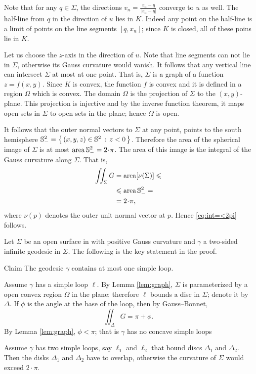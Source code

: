 Note that for any $q\in \Sigma$, the directions $v_n=\tfrac{x_n-q}{|x_n-q|}$ converge to $u$ as well.
The half-line from $q$ in the direction of $u$ lies in $K$.
Indeed any point on the half-line is a limit of points on the line segments $[q,x_n]$;
since $K$ is closed, all of these poins lie in $K$.


Let us choose the $z$-axis in the direction of $u$.
Note that line segments can not lie in $\Sigma$, otherwise its Gauss curvature would vanish.
It follows that any vertical line can intersect $\Sigma$ at most at one point.
That is, $\Sigma$ is a graph of a function $z=f(x,y)$.
Since $K$ is convex, the function $f$ is convex and it is defined in a region $\Omega$ which is convex.
The domain $\Omega$ is the projection of $\Sigma$ to the $(x,y)$-plane.
This projection is injective and by the inverse function theorem, it maps open sets in $\Sigma$ to open sets in the plane;
hence $\Omega$ is open.

It follows that the outer normal vectors to $\Sigma$ at any point, points to the south hemisphere $\mathbb{S}^2_-=\left\{\,{(x,y,z)\in\mathbb{S}^2}\,:\,{z< 0}\,\right\}$.
Therefore the area of the spherical image of $\Sigma$ is at most $\area\SS^2_-= 2\cdot\pi$.
The area of this image is the integral of the Gauss curvature along $\Sigma$.
That is,
\begin{align*}
\iint_{\Sigma}G&=\area[\nu(\Sigma)]\le 
\\
&\le \area\SS^2_-=
\\
&=2\cdot\pi,
\end{align*}
where $\nu(p)$ denotes the outer unit normal vector at $p$.
Hence \ref{eq:int=<2pi} follows.
\qeds

Let $\Sigma$ be an open surface in with positive Gauss curvature and $\gamma$ a two-sided infinite geodesic in $\Sigma$.
The following is the key statement in the proof.

\begin{thm}{Claim}
The geodesic $\gamma$ contains at most one simple loop.
\end{thm}

Assume $\gamma$ has a simple loop $\ell$.
By Lemma \ref{lem:graph}, $\Sigma$ is parameterized by a open convex region $\Omega$ in the plane;
therefore $\ell$ bounds a disc in $\Sigma$; denote it by $\Delta$.
If $\phi$ is the angle at the base of the loop, then by Gauss--Bonnet,
\[\iint_\Delta G=\pi+\phi.\] 
By Lemma \ref{lem:graph}, $\phi<\pi$; that is $\gamma$ has no concave simple loops 

Assume $\gamma$ has two simple loops, say $\ell_1$ and $\ell_2$ that bound discs $\Delta_1$ and $\Delta_2$.
Then the disks $\Delta_1$ and $\Delta_2$ have to overlap,
otherwise the curvature of $\Sigma$ would exceed $2\cdot\pi$.

